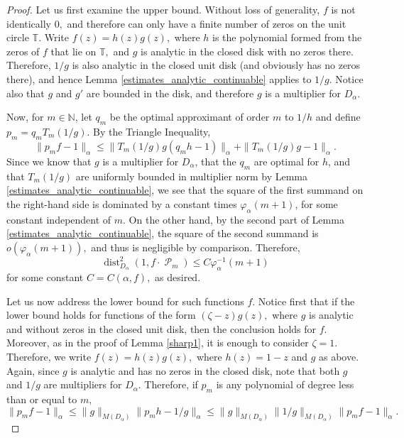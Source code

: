 \documentclass[11 pt,reqno]{amsart}
\theoremstyle{definition}
\theoremstyle{remark}
\numberwithin{equation}{section} \numberwithin{figure}{section}
\newcommand{\TT}{{\mathbb T}}
\newcommand{\NN}{{\mathbb N}}
\DeclareMathOperator{\Pol}{{\mathcal P}}
\DeclareMathOperator{\dist}{dist}
\begin{document}
\begin{proof}
Let us first examine the upper bound. Without loss of generality, $f$ is not identically $0,$
and therefore can only have a finite number of zeros on the unit circle $\TT.$
Write $f(z) = h(z) g(z),$ where $h$ is the polynomial formed from the zeros of $f$ that
lie on $\TT,$ and $g$ is analytic in the closed disk with no zeros there.  Therefore,
$1/g$ is also analytic in the closed unit disk (and obviously has no zeros there), and
hence Lemma \ref{estimates_analytic_continuable} applies to $1/g$.  Notice also that $g$
and $g'$ are bounded in the disk, and therefore $g$ is a multiplier for $D_{\alpha}.$

Now, for $m\in\NN$, let $q_m$ be the optimal approximant of order $m$ to $1/h$
and define $p_m = q_m T_m(1/g)$.  By the Triangle Inequality,
\[\|p_m f -1\|_\alpha \leq \|T_m(1/g) g(q_m h -1) \|_\alpha + \|T_m(1/g) g -1\|_\alpha.\]
Since we know that $g$ is a multiplier for $D_{\alpha}$, that the $q_m$ are optimal for $h$,
and that $T_m(1/g)$ are uniformly bounded in multiplier norm by Lemma
\ref{estimates_analytic_continuable}, we see that the square of the first summand on
the right-hand side is dominated by a constant times $\varphi_{\alpha}(m+1)$, for some
constant independent of $m$.  On the other hand, by the second part of Lemma
\ref{estimates_analytic_continuable}, the square of the second summand is
$o(\varphi_{\alpha}(m+1)),$ and thus is negligible by comparison. Therefore,
$$ \dist_{D_{\alpha}}^{2}(1,f\cdot\Pol_{m}) \leq C\varphi_{\alpha}^{-1}(m+1)$$ for
some constant $C=C(\alpha,f),$ as desired.

Let us now address the lower bound for such functions $f.$ Notice first that if the lower
bound holds for functions of the form $(\zeta - z) g(z),$ where $g$ is analytic and without
zeros in the closed unit disk, then the conclusion holds for $f.$
Moreover, as in the proof of Lemma \ref{sharp1}, it is enough to
consider $\zeta = 1.$ Therefore, we write $f(z) = h(z) g(z),$ where
$h(z) = 1-z$ and $g$ as above.  Again, since $g$ is analytic and has
no zeros in the closed disk, note that both $g$ and $1/g$ are
multipliers for $D_{\alpha}.$ Therefore, if $p_m$ is any polynomial
of degree less than or equal to $m,$
$$ \|p_m f - 1\|_{\alpha} \leq \|g\|_{M(D_{\alpha})} \|p_m h - 1/g\|_{\alpha} \leq \|g\|_{M(D_{\alpha})} \|1/g\|_{M(D_{\alpha})} \|p_m f - 1\|_{\alpha}.$$



\end{proof}
\end{document}
